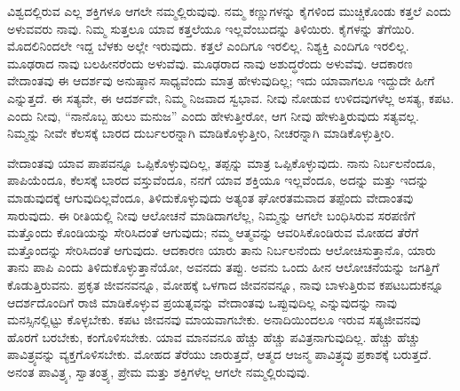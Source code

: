 \vskip  0.2cm

ವಿಶ್ವದಲ್ಲಿರುವ ಎಲ್ಲ ಶಕ್ತಿಗಳೂ ಆಗಲೇ ನಮ್ಮಲ್ಲಿರುವುವು. ನಮ್ಮ ಕಣ್ಣುಗಳನ್ನು ಕೈಗಳಿಂದ ಮುಚ್ಚಿಕೊಂಡು ಕತ್ತಲೆ ಎಂದು ಅಳುವವರು ನಾವು. ನಿಮ್ಮ ಸುತ್ತಲೂ ಯಾವ ಕತ್ತಲೆಯೂ ಇಲ್ಲವೆಂಬುದನ್ನು ತಿಳಿಯಿರು. ಕೈಗಳನ್ನು ತೆಗೆಯಿರಿ. ಮೊದಲಿನಿಂದಲೇ ಇದ್ದ ಬೆಳಕು ಅಲ್ಲೇ ಇರುವುದು. ಕತ್ತಲೆ ಎಂದಿಗೂ ಇರಲಿಲ್ಲ. ನಿಶ್ಯಕ್ತಿ ಎಂದಿಗೂ ಇರಲಿಲ್ಲ. ಮೂಢರಾದ ನಾವು ಬಲಹೀನರೆಂದು ಅಳುವೆವು. ಮೂಢರಾದ ನಾವು ಅಶುದ್ಧರೆಂದು ಅಳುವೆವು. ಆದಕಾರಣ ವೇದಾಂತವು ಈ ಆದರ್ಶವು ಅನುಷ್ಠಾನ ಸಾಧ್ಯವೆಂದು ಮಾತ್ರ ಹೇಳುವುದಿಲ್ಲ; ಇದು ಯಾವಾಗಲೂ ಇದ್ದುದೇ ಹೀಗೆ ಎನ್ನುತ್ತದೆ. ಈ ಸತ್ಯವೇ, ಈ ಆದರ್ಶವೇ, ನಿಮ್ಮ ನಿಜವಾದ ಸ್ವಭಾವ. ನೀವು ನೋಡುವ ಉಳಿದವುಗಳೆಲ್ಲ ಅಸತ್ಯ, ಕಪಟ. ಎಂದು ನೀವು, “ನಾನೊಬ್ಬ ಹುಲು ಮನುಜ” ಎಂದು ಹೇಳುತ್ತೀರೋ, ಆಗ ನೀವು ಹೇಳುತ್ತಿರುವುದು ಸತ್ಯವಲ್ಲ. ನಿಮ್ಮನ್ನು ನೀವೇ ಕೆಲಸಕ್ಕೆ ಬಾರದ ದುರ್ಬಲರನ್ನಾಗಿ ಮಾಡಿಕೊಳ್ಳುತ್ತೀರಿ, ನೀಚರನ್ನಾಗಿ ಮಾಡಿಕೊಳ್ಳುತ್ತೀರಿ. 

\vskip  0.2cm

ವೇದಾಂತವು ಯಾವ ಪಾಪವನ್ನೂ ಒಪ್ಪಿಕೊಳ್ಳುವುದಿಲ್ಲ, ತಪ್ಪನ್ನು ಮಾತ್ರ ಒಪ್ಪಿಕೊಳ್ಳುವುದು. ನಾನು ನಿರ್ಬಲನೆಂದೂ, ಪಾಪಿಯೆಂದೂ, ಕೆಲಸಕ್ಕೆ ಬಾರದ ವಸ್ತುವೆಂದೂ, ನನಗೆ ಯಾವ ಶಕ್ತಿಯೂ ಇಲ್ಲವೆಂದೂ, ಅದನ್ನು ಮತ್ತು ಇದನ್ನು ಮಾಡುವುದಕ್ಕೆ ಆಗುವುದಿಲ್ಲವೆಂದೂ, ತಿಳಿದುಕೊಳ್ಳುವುದು ಅತ್ಯಂತ ಘೋರತಮವಾದ ತಪ್ಪೆಂದು ವೇದಾಂತವು ಸಾರುವುದು. ಈ ರೀತಿಯಲ್ಲಿ ನೀವು ಆಲೋಚನೆ ಮಾಡಿದಾಗಲೆಲ್ಲ, ನಿಮ್ಮನ್ನು ಆಗಲೇ ಬಂಧಿಸಿರುವ ಸರಪಣಿಗೆ ಮತ್ತೊಂದು ಕೊಂಡಿಯನ್ನು ಸೇರಿಸಿದಂತೆ ಆಗುವುದು; ನಮ್ಮ ಆತ್ಮವನ್ನು ಆವರಿಸಿಕೊಂಡಿರುವ ಮೋಹದ ತೆರೆಗೆ ಮತ್ತೊಂದನ್ನು ಸೇರಿಸಿದಂತೆ ಆಗುವುದು. ಆದಕಾರಣ ಯಾರು ತಾನು ನಿರ್ಬಲನೆಂದು ಆಲೋಚಿಸುತ್ತಾನೊ, ಯಾರು ತಾನು ಪಾಪಿ ಎಂದು ತಿಳಿದುಕೊಳ್ಳುತ್ತಾನೆಯೋ, ಅವನದು ತಪ್ಪು. ಅವನು ಒಂದು ಹೀನ ಆಲೋಚನೆಯನ್ನು ಜಗತ್ತಿಗೆ ಕೊಡುತ್ತಿರುವನು. ಪ್ರಕೃತ ಜೀವನವನ್ನೂ, ಮೋಹಕ್ಕೆ ಒಳಗಾದ ಜೀವನವನ್ನೂ, ನಾವು ಬಾಳುತ್ತಿರುವ ಕಪಟಬದುಕನ್ನೂ ಆದರ್ಶದೊಂದಿಗೆ ರಾಜಿ ಮಾಡಿಕೊಳ್ಳುವ ಪ್ರಯತ್ನವನ್ನು ವೇದಾಂತವು ಒಪ್ಪುವುದಿಲ್ಲ ಎನ್ನುವುದನ್ನು ನಾವು ಮನಸ್ಸಿನಲ್ಲಿಟ್ಟು ಕೊಳ್ಳಬೇಕು. ಕಪಟ ಜೀವನವು ಮಾಯವಾಗಬೇಕು. ಅನಾದಿಯಿಂದಲೂ ಇರುವ ಸತ್ಯಜೀವನವು ಹೊರಗೆ ಬರಬೇಕು, ಕಂಗೊಳಿಸಬೇಕು. ಯಾವ ಮಾನವನೂ ಹೆಚ್ಚು ಹೆಚ್ಚು ಪವಿತ್ರನಾಗುವುದಿಲ್ಲ. ಹೆಚ್ಚು ಹೆಚ್ಚು ಪಾವಿತ್ರ್ಯವನ್ನು ವ್ಯಕ್ತಗೊಳಿಸಬೇಕು. ಮೋಹದ ತೆರೆಯು ಜಾರುತ್ತದೆ, ಆತ್ಮದ ಆಜನ್ಮ ಪಾವಿತ್ರ್ಯವು ಪ್ರಕಾಶಕ್ಕೆ ಬರುತ್ತದೆ. ಅನಂತ ಪಾವಿತ್ರ್ಯ, ಸ್ವಾತಂತ್ರ್ಯ, ಪ್ರೇಮ ಮತ್ತು ಶಕ್ತಿಗಳೆಲ್ಲ ಆಗಲೇ ನಮ್ಮಲ್ಲಿರುವುವು. 

\vskip  0.2cm

